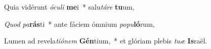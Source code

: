 \item Quia vidérunt \textit{ó}\textit{cu}\textit{li} \textbf{me}i~* salu\textit{tá}\textit{re} \textbf{tu}um,
\item \textit{Quod} \textit{pa}\textbf{rás}ti~* ante fáciem ómnium \textit{po}\textit{pu}\textbf{ló}rum,
\item Lumen ad revela\textit{ti}\textit{ó}\textit{nem} \textbf{Gén}tium,~* et glóriam plebis \textit{tu}\textit{æ} \textbf{Is}raël.
